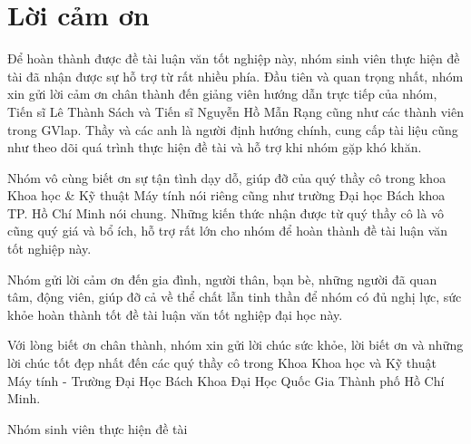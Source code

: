 \chapter*{Lời cảm ơn}
\onehalfspacing
\vspace{1.0cm}
Để hoàn thành được đề tài luận văn tốt nghiệp này, nhóm sinh viên thực hiện đề tài đã nhận được sự hỗ trợ từ rất nhiều phía. Đầu tiên và quan trọng nhất, nhóm xin gửi lời cảm ơn chân thành đến giảng viên hướng dẫn trực tiếp của nhóm, Tiến sĩ Lê Thành Sách và Tiến sĩ Nguyễn Hồ Mẫn Rạng cũng như các thành viên trong GVlap. Thầy và các anh là người định hướng chính, cung cấp tài liệu cũng như theo dõi quá trình thực hiện đề tài và hỗ trợ khi nhóm gặp khó khăn.\par

Nhóm vô cùng biết ơn sự tận tình dạy dỗ, giúp đỡ của quý thầy cô trong khoa Khoa học \& Kỹ thuật Máy tính nói riêng cũng như trường Đại học Bách khoa TP. Hồ Chí Minh nói chung. Những kiến thức nhận được từ quý thầy cô là vô cũng quý giá và bổ ích, hỗ trợ rất lớn cho nhóm để hoàn thành đề tài luận văn tốt nghiệp này.\par

Nhóm gửi lời cảm ơn đến gia đình, người thân, bạn bè, những người đã quan tâm, động viên, giúp đỡ cả về thể chất lẫn tinh thần để nhóm có đủ nghị lực, sức khỏe hoàn thành tốt đề tài luận văn tốt nghiệp đại học này.\par

Với lòng biết ơn chân thành, nhóm xin gửi lời chúc sức khỏe, lời biết ơn và những lời chúc tốt đẹp nhất đến các quý thầy cô trong Khoa Khoa học và Kỹ thuật Máy tính - Trường Đại Học Bách Khoa Đại Học Quốc Gia Thành phố Hồ Chí Minh.
\begin{flushright}
 Nhóm sinh viên thực hiện đề tài 
\end{flushright}

\bigskip
